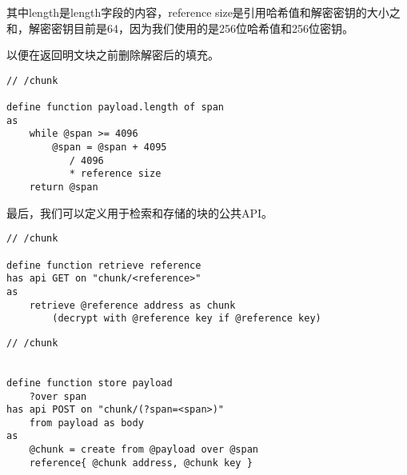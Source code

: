 其中length是length字段的内容，reference size是引用哈希值和解密密钥的大小之和，解密密钥目前是64，因为我们使用的是256位哈希值和256位密钥。

以便在返回明文块之前删除解密后的填充。 

\begin{definition}\label{def:span}
\begin{lstlisting}[language=buzz1]
// /chunk

define function payload.length of span
as
    while @span >= 4096 
        @span = @span + 4095
           / 4096
           * reference size
    return @span
\end{lstlisting}
\end{definition}

最后，我们可以定义用于检索和存储的块的公共API。

\begin{definition}\label{def:retrieve}
\begin{lstlisting}[language=buzz1]
// /chunk

define function retrieve reference
has api GET on "chunk/<reference>"
as 
    retrieve @reference address as chunk
        (decrypt with @reference key if @reference key)
\end{lstlisting}
\end{definition}


\begin{definition} \label{def:store}
\begin{lstlisting}[language=buzz1]
// /chunk


define function store payload
    ?over span 
has api POST on "chunk/(?span=<span>)"
    from payload as body
as 
    @chunk = create from @payload over @span
    reference{ @chunk address, @chunk key }
\end{lstlisting}
\end{definition}



